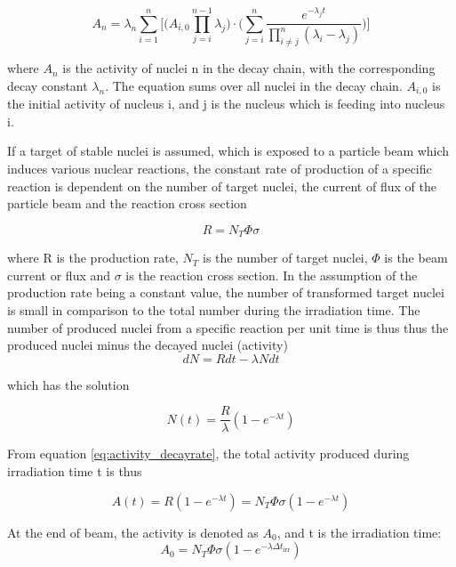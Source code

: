\documentclass[a4paper,11pt,twoside]{book}
\begin{document}
\begin{equation} \label{eq:ndecay_chains}
    A_n = \lambda_n \sum_{i=1}^n \Big[ \Big( A_{i,0}\prod^{n-1}_{j=i}\lambda_j \Big)\cdot \Big( \sum_{j=i}^n \frac{e^{-\lambda_j t}}{\prod_{i\neq j}^n (\lambda_i - \lambda_j)} \Big) \Big]
\end{equation}

where $A_n$ is the activity of nuclei n in the decay chain, with the corresponding decay constant $\lambda_n$. The equation sums over all nuclei in the decay chain. $A_{i,0}$ is the initial activity of nucleus i, and j is the nucleus which is feeding into nucleus i. 

\noindent 
If a target of stable nuclei is assumed, which is exposed to a particle beam which induces various nuclear reactions, the constant rate of production of a specific reaction is dependent on the number of target nuclei, the current of flux of the particle beam and the reaction cross section

\begin{equation}
    R = N_T \Phi \sigma
\end{equation}

\noindent 
where R is the production rate, $N_T$ is the number of target nuclei, $\Phi$ is the beam current or flux and $\sigma$ is the reaction cross section. In the assumption of the production rate being a constant value, the number of transformed target nuclei is small in comparison to the total number during the irradiation time. The number of produced nuclei from a specific reaction per unit time is thus thus the produced nuclei minus the decayed nuclei (activity)
\begin{equation}
    dN = Rdt - \lambda N dt
\end{equation}

which has the solution

\begin{equation}
    N(t) = \frac{R}{\lambda}(1-e^{-\lambda t})
\end{equation}

From equation \ref{eq:activity_decayrate}, the total activity produced during irradiation time t is thus 

\begin{equation} 
    A(t) = R(1-e^{-\lambda t}) = N_T \Phi \sigma (1-e^{-\lambda t})
\end{equation}

At the end of beam, the activity is denoted as $A_0$, and t is the irradiation time:
\begin{equation} \label{eq:activity_eob}
    A_0 = N_T \Phi \sigma (1-e^{-\lambda \Delta t_\text{irr}})
\end{equation}
\end{document}
